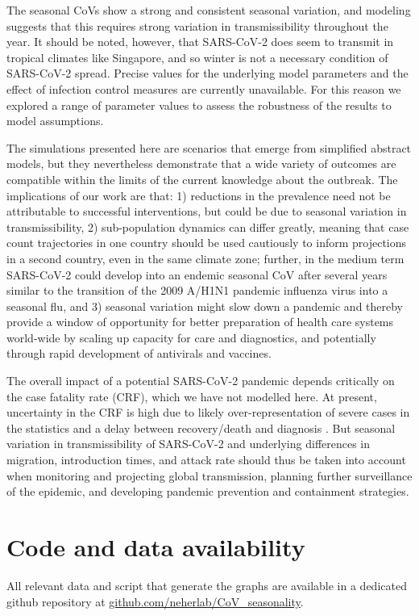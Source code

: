 \documentclass[rmp, reprint, superscriptaddress, floatfix,amsmath]{revtex4-1}
\begin{document}
The seasonal CoVs show a strong and consistent seasonal variation, and modeling suggests that this requires strong variation in transmissibility throughout the year.
It should be noted, however, that SARS-CoV-2 does seem to transmit in tropical climates like Singapore, and so winter is not a necessary condition of SARS-CoV-2 spread. 
Precise values for the underlying model parameters and the effect of infection control measures are currently unavailable. For this reason we explored a range of parameter values to assess the robustness of the results to model assumptions.


The simulations presented here are scenarios that emerge from simplified abstract models, but they nevertheless demonstrate that a wide variety of outcomes are compatible within the limits of the current knowledge about the outbreak. 
The implications of our work are that: 1) reductions in the prevalence need not be attributable to successful interventions, but could be due to seasonal variation in transmissibility, 2) sub-population dynamics can differ greatly, meaning that case count trajectories in one country should be used cautiously to inform projections in a second country, even in the same climate zone; further, in the medium term SARS-CoV-2 could develop into an endemic seasonal CoV after several years similar to the transition of the 2009 A/H1N1 pandemic influenza virus into a seasonal flu, and 3) seasonal variation might slow down a pandemic and thereby provide a window of opportunity for better preparation of health care systems world-wide by scaling up capacity for care and diagnostics, and potentially through rapid development of antivirals and vaccines.

The overall impact of a potential SARS-CoV-2 pandemic depends critically on the case fatality rate (CRF), which we have not modelled here. 
At present, uncertainty in the CRF is high due to likely over-representation of severe cases in the statistics and a delay between recovery/death and diagnosis \citep{battegay_2019-novel_2020}. 
But seasonal variation in transmissibility of SARS-CoV-2 and underlying differences in migration, introduction times, and attack rate should thus be taken into account when monitoring and projecting global transmission, planning further surveillance of the epidemic, and developing pandemic prevention and containment strategies.


\section{Code and data availability}
All relevant data and script that generate the graphs are available in a dedicated github repository at \url{github.com/neherlab/CoV_seasonality}.
\end{document}

